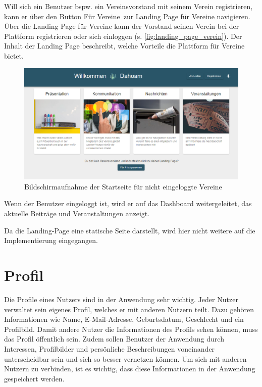 Will sich ein Benutzer bspw. ein Vereinsvorstand mit seinem Verein registrieren, kann er über den Button \glqq Für Vereine\grqq \ zur Landing Page für Vereine navigieren. Über die Landing Page für Vereine kann der Vorstand seinen Verein bei der Plattform registrieren oder sich einloggen (s. \autoref{fig:landing_page_verein}). Der Inhalt der Landing Page beschreibt, welche Vorteile die Plattform für Vereine bietet.


\begin{figure}[!htb]
  \centering
  \includegraphics[width=.9\textwidth]{figures/boas/21_landing_page_verein.png}
  \caption[]{Bildschirmaufnahme der Startseite für nicht eingeloggte Vereine}
  \label{fig:landing_page_verein}
\end{figure}

Wenn der Benutzer eingeloggt ist, wird er auf das Dashboard weitergeleitet, das aktuelle Beiträge und Veranstaltungen anzeigt.

Da die Landing-Page eine statische Seite darstellt, wird hier nicht weitere auf die Implementierung eingegangen.


\section{Profil}
\label{sec:profile}

Die Profile eines Nutzers sind in der Anwendung sehr wichtig.
Jeder Nutzer verwaltet sein eigenes Profil, welches er mit anderen Nutzern teilt.
Dazu gehören Informationen wie Name, E-Mail-Adresse, Geburtsdatum, Geschlecht und ein Profilbild.
Damit andere Nutzer die Informationen des Profils sehen können, muss das Profil öffentlich sein.
Zudem sollen Benutzer der Anwendung durch Interessen, Profilbilder und persönliche Beschreibungen voneinander unterscheidbar sein und sich so besser vernetzen können.
Um sich mit anderen Nutzern zu verbinden, ist es wichtig, dass diese Informationen in der Anwendung gespeichert werden.

